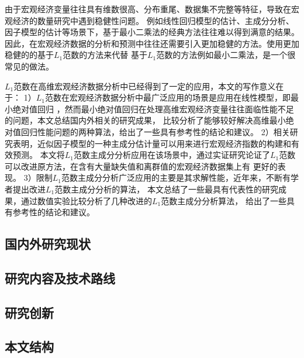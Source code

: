 由于宏观经济变量往往具有维数很高、分布重尾、数据集不完整等特征，导致在宏观经济的数量研究中遇到稳健性问题。
例如线性回归模型的估计、主成分分析、因子模型的估计等场景下，基于最小二乘法的经典方法往往难以得到满意的结果。
因此，在宏观经济数据的分析和预测中往往还需要引入更加稳健的方法。使用更加稳健的的基于$L_1$范数的方法来代替
基于$L_1$范数的方法例如最小二乘法，是一个很常见的做法。

$L_1$范数在高维宏观经济数据分析中已经得到了一定的应用，本文的写作意义在于：
1）$L_1$范数在宏观经济数据分析中最广泛应用的场景是应用在线性模型，即最小绝对值回归
，然而最小绝对值回归在处理高维宏观经济变量往往面临性能不足的问题，本文总结国内外相关的研究成果，
比较分析了能够较好解决高维最小绝对值回归性能问题的两种算法，给出了一些具有参考性的结论和建议。
2）相关研究表明，近似因子模型的一种主成分估计量可以用来进行宏观经济指数的构建和有效预测。
本文将$L_1$范数主成分分析应用在该场景中，通过实证研究论证了$L_1$范数可以改进原方法，在含有大量缺失值和离群值的宏观经济数据集上有
更好的表现。
3）限制$L_1$范数主成分分析广泛应用的主要是其求解性能，近年来，不断有学者提出改进$L_1$范数主成分分析的算法，
本文总结了一些最具有代表性的研究成果，通过数值实验比较分析了几种改进的$L_1$范数主成分分析算法，
给出了一些具有参考性的结论和建议。

\subsection{国内外研究现状}
\subsection{研究内容及技术路线}
\subsection{研究创新}
\subsection{本文结构}